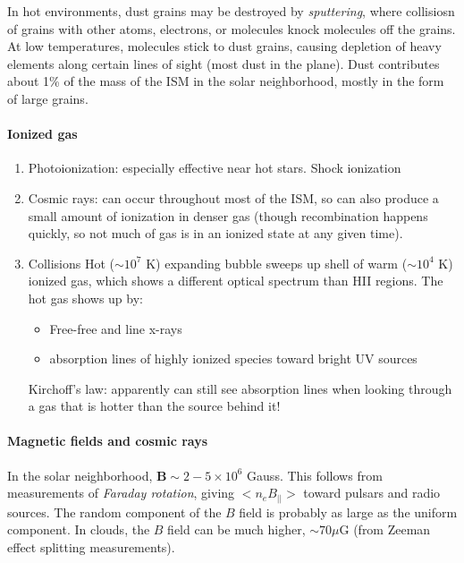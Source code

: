 \documentclass[12pt]{article}
\begin{document}
In hot environments, dust grains may be destroyed by \textit{sputtering},
where collisiosn of grains with other atoms, electrons, or molecules
knock molecules off the grains. At low temperatures,
molecules stick to dust grains, causing depletion of heavy elements
along certain lines of sight (most dust in the plane).
Dust contributes about 1\% of the mass of the ISM in the solar
neighborhood, mostly in the form of large grains.

\paragraph{Ionized gas}
\begin{enumerate}[label=\alph*)]
    \item Photoionization: especially effective near hot stars. Shock
        ionization
    \item Cosmic rays: can occur throughout most of the ISM, so can also
        produce a small amount of ionization in denser gas (though
        recombination happens quickly, so not much of gas is in an
        ionized state at any given time).
    \item Collisions Hot ($\sim 10^{7}$ K) expanding bubble
        sweeps up shell of warm ($\sim 10^{4}$ K) ionized gas, which shows
        a different optical spectrum than HII regions. The hot gas shows
        up by:
        \begin{itemize}
            \item Free-free and line x-rays
            \item absorption lines of highly ionized species toward
                bright UV sources
        \end{itemize}
        Kirchoff's law: apparently can still see absorption lines when looking
        through a gas that is hotter than the source behind it!
\end{enumerate}

\paragraph{Magnetic fields and cosmic rays}
In the solar neighborhood, $\mathbf{B} \sim 2-5\times10^{6}$ Gauss.
This follows from measurements of \textit{Faraday rotation}, giving
$<n_{e}B_{||}>$ toward pulsars and radio sources. The random component of
the $B$ field is probably as large as the uniform component. In clouds,
the $B$ field can be much higher, $\sim 70 \mu$G (from Zeeman effect splitting
measurements).
\end{document}
